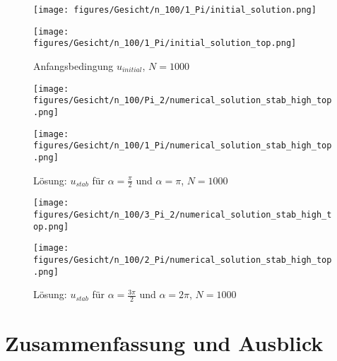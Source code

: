 \documentclass[12pt,titlepage]{article}
\begin{document}
\begin{figure}[H]
\begin{minipage}{0.4\textwidth}
\texttt{[image: figures/Gesicht/n\_100/1\_Pi/initial\_solution.png]}
\end{minipage}
\hspace{1.4cm}
\begin{minipage}{0.4\textwidth}
\texttt{[image: figures/Gesicht/n\_100/1\_Pi/initial\_solution\_top.png]}
\end{minipage}
\caption{Anfangsbedingung $u_{initial}$, $N=1000$}
\label{fig:init_gauss}
\end{figure}
\begin{figure}[H]
\begin{minipage}{0.45\textwidth}
 \texttt{[image: figures/Gesicht/n\_100/Pi\_2/numerical\_solution\_stab\_high\_top.png]}
\vspace{-0.4cm}
\end{minipage}
\begin{minipage}{0.45\textwidth}
 \texttt{[image: figures/Gesicht/n\_100/1\_Pi/numerical\_solution\_stab\_high\_top.png]}
\vspace{-0.4cm}
\end{minipage}
\caption{Lösung: $u_{stab}$ für $\alpha=\frac{\pi}{2}$ und $\alpha=\pi$, $N=1000$}
\label{fig:gauss_pi}
\end{figure}
\vspace{-0.4cm}
\begin{figure}[H]
\begin{minipage}{0.45\textwidth}
 \texttt{[image: figures/Gesicht/n\_100/3\_Pi\_2/numerical\_solution\_stab\_high\_top.png]}
\vspace{-0.4cm}
\end{minipage}
\begin{minipage}{0.45\textwidth}
 \texttt{[image: figures/Gesicht/n\_100/2\_Pi/numerical\_solution\_stab\_high\_top.png]}
\vspace{-0.4cm}
\end{minipage}
\caption{Lösung: $u_{stab}$ für $\alpha=\frac{3\pi}{2}$ und $\alpha=2\pi$, $N=1000$}
\label{fig:gauss_2pi}
\end{figure}
\pagebreak
\section{Zusammenfassung und Ausblick}
\pagebreak
{}
\appendix


\end{document}
